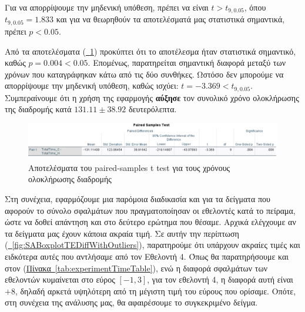 Για να απορρίψουμε την μηδενική υπόθεση, πρέπει να είναι $t > t_{9,0.05}$, όπου $t_{9,0.05} = 1.833$ και για να θεωρηθούν τα αποτελέσματά μας στατιστικά σημαντικά, πρέπει $p < 0.05$.

Από τα αποτελέσματα (\hyperref[fig:SATTestTTDiff]{\schema~\ref*{fig:SATTestTTDiff}}) προκύπτει ότι το αποτέλεσμα ήταν στατιστικά σημαντικό, καθώς $p = 0.004 < 0.05$. Επομένως, παρατηρείται σημαντική διαφορά μεταξύ των χρόνων που καταγράφηκαν κάτω από τις δύο συνθήκες. Ωστόσο δεν μπορούμε να απορρίψουμε την μηδενική υπόθεση, καθώς ισχύει: $t = -3.369 < t_{9,0.05}$. Συμπεραίνουμε ότι η χρήση της εφαρμογής \textbf{αύξησε} τον συνολικό χρόνο ολοκλήρωσης της διαδρομής κατά $131.11 \pm 38.92$ δευτερόλεπτα.

\begin{figure}[!h]
    \centering
    \includegraphics[width=1\linewidth]{./images/SA_TTestResult_TotalTimeDiff.png}
    \caption{Αποτελέσματα του paired-samples t test για τους χρόνους ολοκλήρωσης διαδρομής}\label{fig:SATTestTTDiff}
\end{figure}

Στη συνέχεια, εφαρμόζουμε μια παρόμοια διαδικασία και για τα δείγματα που αφορούν το σύνολο σφαλμάτων που πραγματοποίησαν οι εθελοντές κατά το πείραμα, ώστε να δοθεί απάντηση και στο δεύτερο ερώτημα που θέσαμε. Αρχικά ελέγχουμε αν τα δείγματα μας έχουν κάποια ακραία τιμή. Σε αυτήν την περίπτωση (\hyperref[fig:SABoxplotTEDiffWithOutliers]{\schema~\ref*{fig:SABoxplotTEDiffWithOutliers}}), παρατηρούμε ότι υπάρχουν ακραίες τιμές και ειδκότερα αυτές που αντλήσαμε από τον Εθελοντή 4. Όπως θα παρατηρήσουμε και στον (\hyperref[tab:experimentTimeTable]{Πίνακα~\ref*{tab:experimentTimeTable}}), ενώ η διαφορά σφαλμάτων των εθελοντών κυμαίνεται στο εύρος $[-1, 3]$, για τον εθελοντή 4, η διαφορά αυτή είναι $+8$, δηλαδή αρκετά υψηλότερη από τη μέγιστη τιμή του εύρους που ορίσαμε. Οπότε, στη συνέχεια της ανάλυσης μας, θα αφαιρέσουμε το συγκεκριμένο δείγμα.

